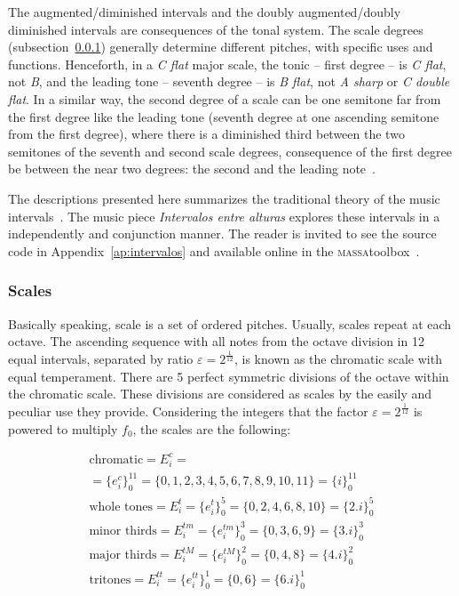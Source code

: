 \documentclass[
 aip,
 jmp,
 amsmath,amssymb,
 reprint,
]{revtex4-1}
\newcommand{\massa}{{\large \textsc{massa}}}
\begin{document}
The augmented/diminished intervals and the doubly augmented/doubly diminished intervals are consequences of the tonal system. The scale degrees (subsection~\ref{subsec:escalas}) generally determine different pitches, with
specific uses and functions. Henceforth, in a \textit{C flat} major scale, the tonic -- first degree -- is \textit{C flat}, not \textit{B}, and the leading tone -- seventh degree -- is \textit{B flat}, not \textit{A sharp} or \textit{C double flat}. In a similar way, the second degree of a scale can be one semitone far from the first degree like the leading tone (seventh degree at one ascending semitone from the first degree), where there is a diminished third between the two semitones of the seventh and second scale degrees, consequence of the first degree be between the near two degrees: the second and the leading note~\cite{Lacerda}.

The descriptions presented here summarizes the traditional theory of the music
intervals~\cite{Lacerda}. The music piece \emph{Intervalos entre alturas}
explores these intervals in a independently and conjunction manner. The reader is invited to see the source code in Appendix~\ref{ap:intervalos} and available online in the \massa toolbox~\cite{MASSA}.


\subsubsection{Scales}\label{subsec:escalas}

Basically speaking, scale is a set of ordered pitches. Usually, scales repeat at each octave. The ascending sequence with all notes from the octave division in 12 equal intervals, separated by ratio $\varepsilon=2^{\frac{1}{12}}$, is known as the chromatic scale with equal temperament. There are 5 perfect symmetric divisions of the octave within the chromatic scale. These divisions are considered as scales by the easily and peculiar use they provide. Considering the integers that the factor $\varepsilon=2^{\frac{1}{12}}$ is powered to multiply $f_0$, the scales are the following:

\begin{multline}\label{escSim}
\text{chromatic}  = E_i^c = \\ = \{e_i^c\}_0^{11} =  \{0,1,2,3,4,5,6,7,8,9,10,11\} = \{i\}_0^{11}\\
\text{whole tones}  = E_i^t = \{e_i^t\}_0^{5} = \{0,2,4,6,8,10\} = \{2.i\}_0^{5} \\
\text{minor thirds}  = E_i^{tm} = \{e_i^{tm}\}_0^{3} = \{0,3,6,9\} = \{3.i\}_0^3 \\
\text{major thirds}  = E_i^{tM} = \{e_i^{tM}\}_0^{2} = \{0,4,8\} = \{4.i\}_0^2\\
\text{tritones}  = E_i^{tt} = \{e_i^{tt}\}_0^{1} = \{ 0, 6 \} = \{6.i\}_0^1
\end{multline}
\end{document}
